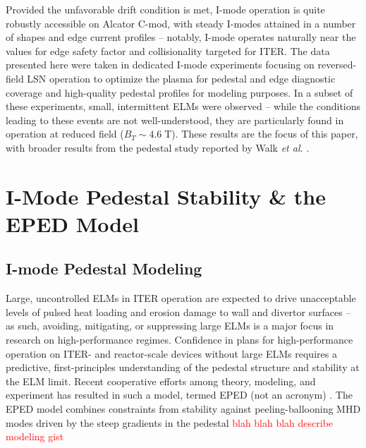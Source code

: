 \documentclass[12pt,floatfix,showpacs]{revtex4-1}
\newcommand{\note}[1]{\textcolor{red}{#1}}
\newcommand{\gnote}[1]{\marginpar{\textcolor{red}{\scriptsize{#1}}}}
\begin{document}
Provided the unfavorable drift condition is met, I-mode operation is quite robustly accessible on Alcator C-mod, with steady I-modes attained in a number of shapes and edge current profiles -- notably, I-mode operates naturally near the values for edge safety factor and collisionality targeted for ITER.  
The data presented here were taken in dedicated I-mode experiments focusing on reversed-field LSN operation to optimize the plasma for pedestal and edge diagnostic coverage and high-quality pedestal profiles for modeling purposes.  
In a subset of these experiments, small, intermittent ELMs were observed -- while the conditions leading to these events are not well-understood, they are particularly found in operation at reduced field ($B_T \sim 4.6 \;\mbox{T}$).  
These results are the focus of this paper, with broader results from the pedestal study reported by Walk \emph{et al.} \cite{Walk2014}.\gnote{get formatting right}

\section{I-Mode Pedestal Stability \& the EPED Model}\label{sec:model}

\subsection{I-mode Pedestal Modeling}\label{subsec:imode_ped_mod}

Large, uncontrolled ELMs in ITER operation are expected to drive unacceptable levels of pulsed heat loading and erosion damage to wall and divertor surfaces \cite{Loarte2003,Federici2003} -- as such, avoiding, mitigating, or suppressing large ELMs is a major focus in research on high-performance regimes.  
Confidence in plans for high-performance operation on ITER- and reactor-scale devices without large ELMs requires a predictive, first-principles understanding of the pedestal structure and stability at the ELM limit.  
Recent cooperative efforts among theory, modeling, and experiment \cite{Groebner2013} has resulted in such a model, termed EPED (not an acronym) \cite{Snyder2009,Snyder2011}.  
The EPED model combines constraints from stability against peeling-ballooning MHD modes driven by the steep gradients in the pedestal \note {blah blah blah describe modeling gist}
\end{document}
